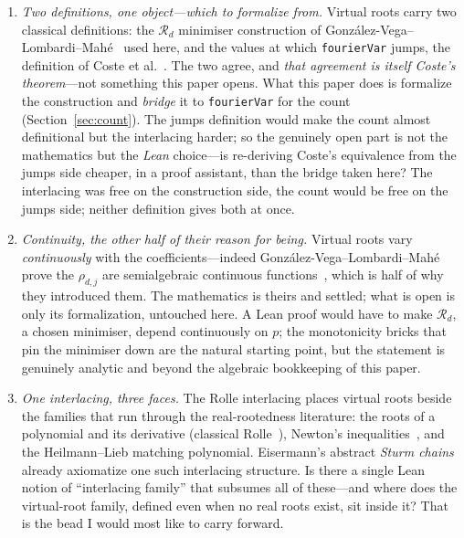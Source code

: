 \documentclass[11pt]{article}
\newcommand{\lean}[1]{\texttt{#1}}
\newcommand{\Rd}{\mathcal{R}}
\begin{document}
\begin{enumerate}\itemsep3pt
\item \emph{Two definitions, one object---which to formalize from.} Virtual roots carry two classical
definitions: the $\Rd_d$ minimiser construction of Gonz\'alez-Vega--Lombardi--Mah\'e~\cite{glm} used
here, and the values at which \lean{fourierVar} jumps, the definition of Coste et al.~\cite{coste}. The
two agree, and \emph{that agreement is itself Coste's theorem}---not something this paper opens. What
this paper does is formalize the construction and \emph{bridge} it to \lean{fourierVar} for the count
(Section~\ref{sec:count}). The jumps definition would make the count almost definitional but the
interlacing harder; so the genuinely open part is not the mathematics but the \emph{Lean} choice---is
re-deriving Coste's equivalence from the jumps side cheaper, in a proof assistant, than the bridge taken
here? The interlacing was free on the construction side, the count would be free on the jumps side;
neither definition gives both at once.
\item \emph{Continuity, the other half of their reason for being.} Virtual roots vary
\emph{continuously} with the coefficients---indeed Gonz\'alez-Vega--Lombardi--Mah\'e prove the
$\rho_{d,j}$ are semialgebraic continuous functions~\cite{glm}, which is half of why they introduced
them. The mathematics is theirs and settled; what is open is only its formalization, untouched here. A
Lean proof would have to make $\Rd_d$, a chosen minimiser, depend continuously on $p$; the monotonicity
bricks that pin the minimiser down are the natural starting point, but the statement is genuinely
analytic and beyond the algebraic bookkeeping of this paper.
\item \emph{One interlacing, three faces.} The Rolle interlacing places virtual roots beside the
families that run through the real-rootedness literature: the roots of a polynomial and its
derivative (classical Rolle~\cite{rolle}), Newton's inequalities~\cite{newton}, and the
Heilmann--Lieb matching polynomial. Eisermann's abstract \emph{Sturm chains}~\cite{eisermann} already
axiomatize one such interlacing structure. Is there a single Lean notion of ``interlacing family''
that subsumes all of these---and where does the virtual-root family, defined even when no real roots
exist, sit inside it? That is the bead I would most like to carry forward.
\end{enumerate}
\end{document}
